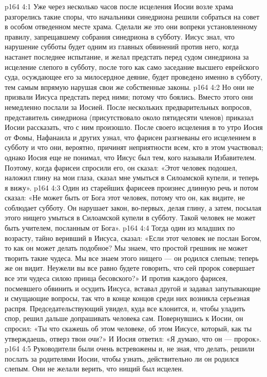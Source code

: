\vs p164 4:1 Уже через несколько часов после исцеления Иосии возле храма разгорелись такие споры, что начальники синедриона решили собраться на совет в особом отведенном месте храма. Сделали же это они вопреки установленному правилу, запрещавшему собрания синедриона в субботу. Иисус знал, что нарушение субботы будет одним из главных обвинений против него, когда настанет последнее испытание, и желал предстать перед судом синедриона за исцеление слепого в субботу, после того как само заседание высшего еврейского суда, осуждающее его за милосердное деяние, будет проведено именно в субботу, тем самым впрямую нарушая свои же собственные законы.
\vs p164 4:2 Но они не призвали Иисуса предстать перед ними; потому что боялись. Вместо этого они немедленно послали за Иосией. После нескольких предварительных вопросов, представитель синедриона (присутствовало около пятидесяти членов) приказал Иосии рассказать, что с ним произошло. После своего исцеления в то утро Иосия от Фомы, Нафанаила и других узнал, что фарисеи разгневаны его исцелением в субботу и что они, вероятно, причинят неприятности всем, кто в этом участвовал; однако Иосия еще не понимал, что Иисус был тем, кого называли Избавителем. Поэтому, когда фарисеи спросили его, он сказал: «Этот человек подошел, наложил глину на мои глаза, сказал мне умыться в Силоамской купели, и теперь я вижу».
\vs p164 4:3 Один из старейших фарисеев произнес длинную речь и потом сказал: «Не может быть от Бога этот человек, потому что он, как видите, не соблюдает субботу. Он нарушает закон, во\hyp{}первых, делая глину, а затем, посылая этого нищего умыться в Силоамской купели в субботу. Такой человек не может быть учителем, посланным от Бога».
\vs p164 4:4 Тогда один из младших по возрасту, тайно веривший в Иисуса, сказал: «Если этот человек не послан Богом, то как он может делать подобное? Мы знаем, что простой грешник не может творить такие чудеса. Мы все знаем этого нищего --- он родился слепым; теперь же он видит. Неужели вы все равно будете говорить, что сей пророк совершает все эти чудеса силою принца бесовского?» И против каждого фарисея, посмевшего обвинить и осудить Иисуса, вставал другой и задавал запутывающие и смущающие вопросы, так что в конце концов среди них возникла серьезная распря. Председательствующий увидел, куда все клонится, и, чтобы уладить спор, решил дальше допрашивать человека сам. Повернувшись к Иосии, он спросил: «Ты что скажешь об этом человеке, об этом Иисусе, который, как ты утверждаешь, отверз твои очи?» И Иосия ответил: «Я думаю, что он --- пророк».
\vs p164 4:5 Руководители были очень встревожены и, не зная, что делать, решили послать за родителями Иосии, чтобы узнать, действительно ли он родился слепым. Они не желали верить, что нищий был исцелен.
